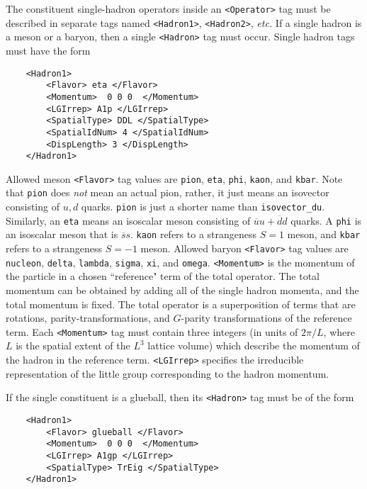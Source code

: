 \documentclass[12pt]{article}
\newcommand{\vb}{\texttt}
\begin{document}
The constituent single-hadron operators inside an \vb{<Operator>} tag
must be described in   
separate tags named \vb{<Hadron1>}, \vb{<Hadron2>}, \textit{etc.}  If a single hadron 
is a meson or a baryon, then a single \vb{<Hadron>} tag must occur.
Single hadron tags must have the form    
\begin{verbatim}                
    <Hadron1>                                               
        <Flavor> eta </Flavor>                               
        <Momentum>  0 0 0  </Momentum>                       
        <LGIrrep> A1p </LGIrrep>                             
        <SpatialType> DDL </SpatialType>                     
        <SpatialIdNum> 4 </SpatialIdNum>                     
        <DispLength> 3 </DispLength>                         
    </Hadron1>                                              
\end{verbatim}                                              
Allowed meson \vb{<Flavor>} tag values are \vb{pion}, \vb{eta}, \vb{phi},   
\vb{kaon}, and \vb{kbar}. Note that \vb{pion} does \textit{not} mean an actual  
pion, rather, it just means an isovector consisting of $u,d$    
quarks.  \vb{pion} is just a shorter name than \vb{isovector\_du}.   
Similarly, an \vb{eta} means an isoscalar meson consisting of    
$\overline{u}u+\overline{d}d$ quarks.  A \vb{phi} is an isoscalar meson 
that is $\overline{s}s$.    
\vb{kaon} refers to a strangeness $S=1$ meson, and \vb{kbar} refers   
to a strangeness $S=-1$ meson. Allowed baryon \vb{<Flavor>} tag      
values are \vb{nucleon}, \vb{delta}, \vb{lambda}, \vb{sigma}, \vb{xi}, and   
\vb{omega}.  \vb{<Momentum>} is the momentum of the particle          
in a chosen ``reference" term of the total operator.  The      
total momentum can be obtained by adding all of the single    
hadron momenta, and the total momentum is fixed.  The total   
operator is a superposition of terms that are rotations,      
parity-transformations, and $G$-parity transformations of the   
reference term. Each \vb{<Momentum>} tag must contain three        
integers (in units of $2\pi/L$, where $L$ is the spatial extent of the
$L^3$ lattice volume) which describe the momentum     
of the hadron in the reference term. \vb{<LGIrrep>} specifies the  
irreducible representation of the little group corresponding  
to the hadron momentum.                                       
                                                              
If the single constituent is a glueball, then its \vb{<Hadron>}    
tag must be of the form                                       
\begin{verbatim}
    <Hadron1>                                               
        <Flavor> glueball </Flavor>                          
        <Momentum>  0 0 0  </Momentum>                       
        <LGIrrep> A1gp </LGIrrep>                            
        <SpatialType> TrEig </SpatialType>                   
    </Hadron1>                                              
\end{verbatim}
\end{document}
